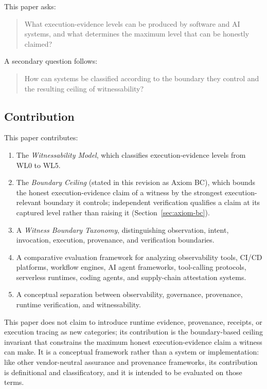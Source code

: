 \documentclass[11pt]{article}
\begin{document}
This paper asks:

\begin{quote}
What execution-evidence levels can be produced by software and AI systems, and what determines the maximum level that can be honestly claimed?
\end{quote}

A secondary question follows:

\begin{quote}
How can systems be classified according to the boundary they control and the resulting ceiling of witnessability?
\end{quote}

\subsection{Contribution}

This paper contributes:

\begin{enumerate}[leftmargin=*]
\item The \emph{Witnessability Model}, which classifies execution-evidence levels from WL0 to WL5.
\item The \emph{Boundary Ceiling} (stated in this revision as Axiom BC), which bounds the honest execution-evidence claim of a witness by the strongest execution-relevant boundary it controls; independent verification qualifies a claim at its captured level rather than raising it (Section~\ref{sec:axiom-bc}).
\item A \emph{Witness Boundary Taxonomy}, distinguishing observation, intent, invocation, execution, provenance, and verification boundaries.
\item A comparative evaluation framework for analyzing observability tools, CI/CD platforms, workflow engines, AI agent frameworks, tool-calling protocols, serverless runtimes, coding agents, and supply-chain attestation systems.
\item A conceptual separation between observability, governance, provenance, runtime verification, and witnessability.
\end{enumerate}

This paper does not claim to introduce runtime evidence, provenance, receipts, or execution tracing as new categories; its contribution is the boundary-based ceiling invariant that constrains the maximum honest execution-evidence claim a witness can make.
It is a conceptual framework rather than a system or implementation: like other vendor-neutral assurance and provenance frameworks, its contribution is definitional and classificatory, and it is intended to be evaluated on those terms.
\end{document}
